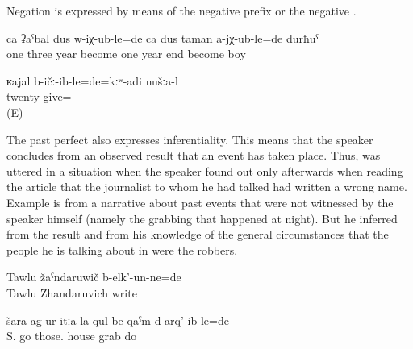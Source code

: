 Negation is expressed by means of the negative prefix   or the negative    .

\begin{exe}
	\ex	\label{ex:‎One boy had turned three, the other was not even one year old analytic}
	\gll	ca	ʡaˁbal	dus	w-iχ-ub-le=de	ca	dus	taman	a-jχ-ub-le=de	durħuˁ\\
		one	three	year	become		one	year	end	become	boy\\
	\glt	{}

	\ex	\label{ex:‎ ‎‎We had not given twenty analytic}
	\gll	ʁajal	b-ičː-ib-le=de=kːʷ-adi	nušːa-l\\
		twenty	give=	\\
	\glt	{} (E)
\end{exe}

The past perfect also expresses inferentiality. This means that the speaker concludes from an observed result that an event has taken place. Thus,  was uttered in a situation when the speaker found out only afterwards when reading the article that the journalist to whom he had talked had written a wrong name. Example  is from a narrative about past events that were not witnessed by the speaker himself (namely the grabbing that happened at night). But he inferred from the result and from his knowledge of the general circumstances that the people he is talking about in  were the robbers.

\begin{exe}
	\ex	\label{ex:(He) had (apparently) written Tawlu Zhandaruvich}
	\gll	Tawlu	žaˁndaruwič	b-elk'-un-ne=de\\
		Tawlu	Zhandaruvich	write\\
	\glt	{}

	\ex	\label{ex:‎They went to Shara and had grabbed their houses}
	\gll	šara	ag-ur	itːa-la	qul-be	qaˁm	d-arq'-ib-le=de\\
		S.	go	those.	house	grab	do\\
	\glt	{}
\end{exe}

